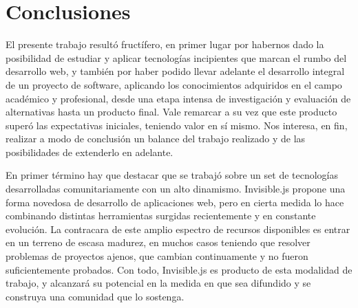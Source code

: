 \documentclass[doc,helv,longtable]{article}
\begin{document}
\section{Conclusiones}
El presente trabajo resultó fructífero, en primer lugar por habernos dado la posibilidad de estudiar y aplicar tecnologías incipientes que marcan el rumbo del desarrollo web, y también por haber podido llevar adelante el desarrollo integral de un proyecto de software, aplicando los conocimientos adquiridos en el campo académico y profesional, desde una etapa intensa de investigación y evaluación de alternativas hasta un producto final. Vale remarcar a su vez que este producto superó las expectativas iniciales, teniendo valor en sí mismo. Nos interesa, en fin, realizar a modo de conclusión un balance del trabajo realizado y de las posibilidades de extenderlo en adelante.

En primer término hay que destacar que se trabajó sobre un set de tecnologías desarrolladas comunitariamente con un alto dinamismo. Invisible.js propone una forma novedosa de desarrollo de aplicaciones web, pero en cierta medida lo hace combinando distintas herramientas surgidas recientemente y en constante evolución. La contracara de este amplio espectro de recursos disponibles es entrar en un terreno de escasa madurez, en muchos casos teniendo que resolver problemas de proyectos ajenos, que cambian continuamente y no fueron suficientemente probados. Con todo, Invisible.js es producto de esta modalidad de trabajo, y alcanzará su potencial en la medida en que sea difundido y se construya una comunidad que lo sostenga.
\end{document}
